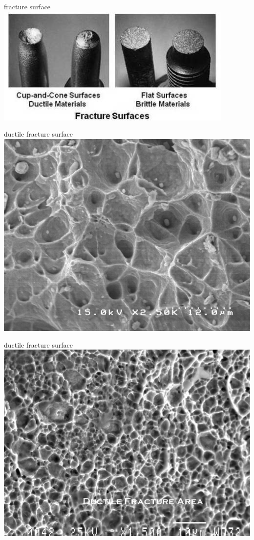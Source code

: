 \documentclass[
  letterpaper,
  ignorenonframetext,
  aspectratio=43,
  handout,
  12pt]{beamer}
\let\Oldincludegraphics\includegraphics
\renewcommand{\includegraphics}[2][]{\Oldincludegraphics[width=\textwidth,height=0.7\textheight,keepaspectratio]{#2}}
\begin{document}
\begin{frame}{fracture surface}
\protect\hypertarget{fracture-surface}{}
\includegraphics{../images/Fracture-Surfaces-.jpg}
\end{frame}

\begin{frame}{ductile fracture surface}
\protect\hypertarget{ductile-fracture-surface}{}
\includegraphics{../images/ductile1.jpg}
\end{frame}

\begin{frame}{ductile fracture surface}
\protect\hypertarget{ductile-fracture-surface-1}{}
\includegraphics{../images/ductile2.jpg}
\end{frame}
\end{document}
